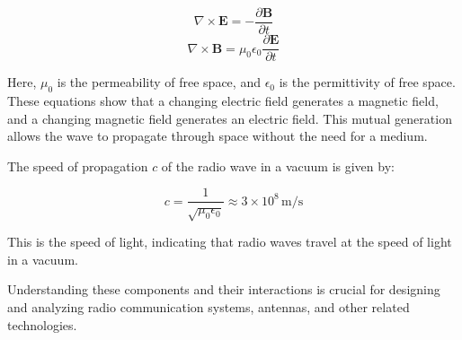 \[
\nabla \times \mathbf{E} = -\frac{\partial \mathbf{B}}{\partial t}
\]
\[
\nabla \times \mathbf{B} = \mu_0 \epsilon_0 \frac{\partial \mathbf{E}}{\partial t}
\]

Here, \(\mu_0\) is the permeability of free space, and \(\epsilon_0\) is the permittivity of free space. These equations show that a changing electric field generates a magnetic field, and a changing magnetic field generates an electric field. This mutual generation allows the wave to propagate through space without the need for a medium.

The speed of propagation \(c\) of the radio wave in a vacuum is given by:

\[
c = \frac{1}{\sqrt{\mu_0 \epsilon_0}} \approx 3 \times 10^8 \, \text{m/s}
\]

This is the speed of light, indicating that radio waves travel at the speed of light in a vacuum.

Understanding these components and their interactions is crucial for designing and analyzing radio communication systems, antennas, and other related technologies.

